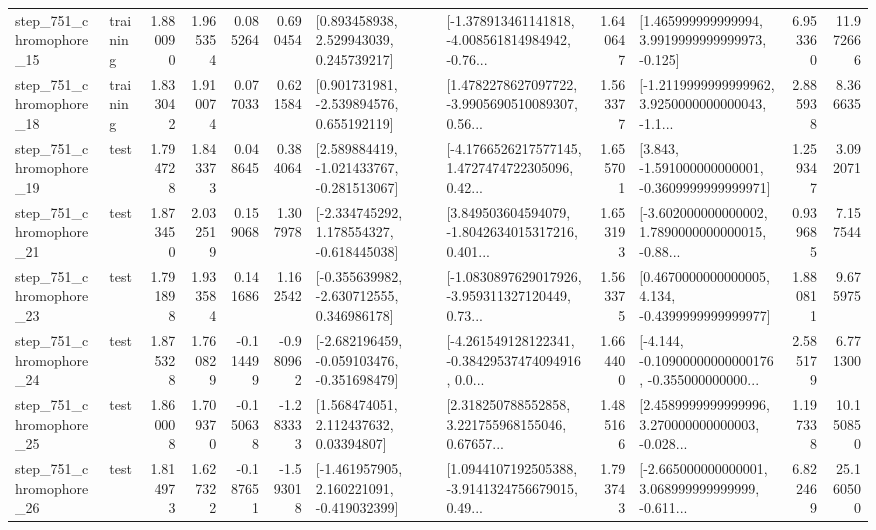 \begin{tabular}{llrrrrllrlrr}
  step\_751\_chromophore\_15 &  training &      1.880090 &    1.965354 &      0.085264 &  0.690454 &     [0.893458938, 2.529943039, 0.245739217] &  [-1.378913461141818, -4.008561814984942, -0.76... &       1.640647 &    [1.465999999999994, 3.9919999999999973, -0.125] &            6.953360 &         11.972666 \\
  step\_751\_chromophore\_18 &  training &      1.833042 &    1.910074 &      0.077033 &  0.621584 &    [0.901731981, -2.539894576, 0.655192119] &  [1.4782278627097722, -3.9905690510089307, 0.56... &       1.563377 &  [-1.2119999999999962, 3.9250000000000043, -1.1... &            2.885938 &          8.366635 \\
  step\_751\_chromophore\_19 &      test &      1.794728 &    1.843373 &      0.048645 &  0.384064 &   [2.589884419, -1.021433767, -0.281513067] &  [-4.1766526217577145, 1.4727474722305096, 0.42... &       1.655701 &   [3.843, -1.591000000000001, -0.3609999999999971] &            1.259347 &          3.092071 \\
  step\_751\_chromophore\_21 &      test &      1.873450 &    2.032519 &      0.159068 &  1.307978 &   [-2.334745292, 1.178554327, -0.618445038] &  [3.849503604594079, -1.8042634015317216, 0.401... &       1.653193 &  [-3.602000000000002, 1.7890000000000015, -0.88... &            0.939685 &          7.157544 \\
  step\_751\_chromophore\_23 &      test &      1.791898 &    1.933584 &      0.141686 &  1.162542 &   [-0.355639982, -2.630712555, 0.346986178] &  [-1.0830897629017926, -3.959311327120449, 0.73... &       1.563375 &   [0.4670000000000005, 4.134, -0.4399999999999977] &            1.880811 &          9.675975 \\
  step\_751\_chromophore\_24 &      test &      1.875328 &    1.760829 &     -0.114499 & -0.980962 &  [-2.682196459, -0.059103476, -0.351698479] &  [-4.261549128122341, -0.38429537474094916, 0.0... &       1.664400 &  [-4.144, -0.10900000000000176, -0.355000000000... &            2.585179 &          6.771300 \\
  step\_751\_chromophore\_25 &      test &      1.860008 &    1.709370 &     -0.150638 & -1.283333 &      [1.568474051, 2.112437632, 0.03394807] &  [2.318250788552858, 3.221755968155046, 0.67657... &       1.485166 &  [2.4589999999999996, 3.270000000000003, -0.028... &            1.197338 &         10.150850 \\
  step\_751\_chromophore\_26 &      test &      1.814973 &    1.627322 &     -0.187651 & -1.593018 &   [-1.461957905, 2.160221091, -0.419032399] &  [1.0944107192505388, -3.9141324756679015, 0.49... &       1.793743 &  [-2.665000000000001, 3.068999999999999, -0.611... &            6.822469 &         25.160500 \\

\end{tabular}
